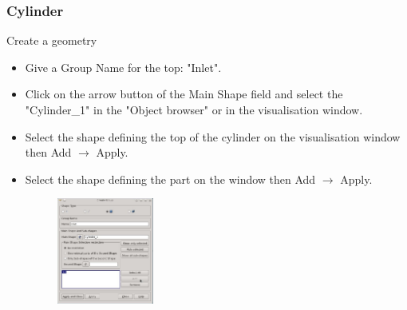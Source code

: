 \documentclass[10pt]{beamer}
\begin{document}
\begin{frame}
\frametitle{Cylinder}
\begin{block}{Create a geometry}

\begin{itemize}
\item Give a Group Name for the top: "Inlet".
\item Click on the arrow button of the Main Shape field and select the "Cylinder\_1" in the "Object browser" or in the visualisation window.\\
\item Select the shape defining the top of the cylinder on the visualisation window then Add $\rightarrow$ Apply.\\

\item Select the shape defining the part on the window then Add $\rightarrow$ Apply.\\
\begin{figure}
\includegraphics[width=0.3\textwidth]{PICTURES/salome3.jpg}
\end{figure}
\end{itemize}

\end{block}
\end{frame}
\end{document}

